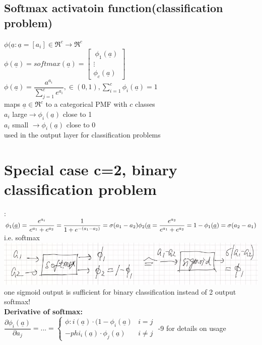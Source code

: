  \subsection{Softmax activatoin function(classification problem)}
 $  \phi (\underline{a} : \underline{a}  = [a_i ] \in \Re^c \rightarrow \Re^c$ \\
 $  \phi ( \underline{a}) = softmax (\underline{a}) = \left[
 \begin{matrix} 
\  \phi_1 (\underline{a}) \\
  \vdots \\
  \phi_c (\underline{a})
 \end{matrix} \right] $ \\
 $ \phi (\underline{a}) = \dfrac{ a^{a_i}}{\sum_{j=1}^{c} e^{a_i }} , \in (0,1) , \sum_{i=1}^{c} \phi_i (\underline{a}) = 1 $ \\
 \textbullet maps $  \underline{a} \in \Re^c  $ to a categorical PMF with $ c $ classes  \\
 \textbullet $  a_i  $ large$  \rightarrow \phi_i (\underline{a} )  $ close to 1 \\
 \textbullet $  a_i  $ small $ \rightarrow \phi_i (\underline{a} )  $ close to 0 \\
 \textbullet used in the output layer for classification problems \\
 \section{Special case c=2, binary classification problem}:
 $ \phi_1 (\underline{a}) = \dfrac{e^{a_i}}{e^{a_1} + e^{a_2}} = \dfrac{1}{1+ e^{-(a_1 - a_2)}} = \sigma (a_1 - a _ 2) \\
 \phi_2 (\underline{a} = \dfrac{e^{a_2}}{e^{a_1} + e^{a_2}} = 1 - \phi_1 (\underline{a}) = \sigma (a_2 - a_1) \\
 $
 i.e. softmax \\
 \includegraphics[width=\linewidth]{Images/OutputLayerSoftmax.png} \\
  one sigmoid output is sufficient for binary classification instead of 2 output softmax! \\
\textbf{  Derivative of softmax:}\\
  $ \dfrac{ \partial \phi_i (\underline{a}) }{\partial a_j} = ... = \left\lbrace \begin{array}{lc}
\phi:i (\underline{a})\cdot ( 1- \phi_i (\underline{a}) & i=j \\
- phi_i (\underline{a}) \cdot \phi_j (\underline{a}) & i \neq j 
  \end{array} \right. $
  -9 for details on usage \\
